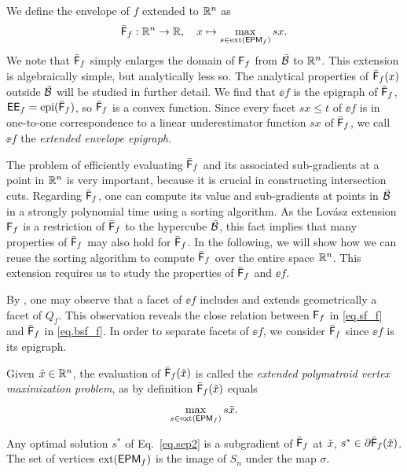 We define the envelope of $f$ extended to $\mathbb R^n$ as
\begin{equation}
    \label{eq.bsf_f}
    \bar{\mathsf F}_{f}: \mathbb R^n \to \mathbb R, \quad x\mapsto \max_{s \in \operatorname{ext}(\mathsf{EPM}_{f})}sx.
\end{equation}
We note that $\bar{\mathsf F}_{f}$ simply enlarges the domain of ${\mathsf F}_f$ from $\bar{\mathcal B}$ to $\mathbb R^n$. This extension is algebraically simple, but analytically less so. The analytical properties of $\bar{\mathsf F}_{f}(x)$ outside $\bar{\mathcal B}$ will be studied in further detail. We find that
$\ee{f}$ is the epigraph of $\bar{\mathsf F}_{f}$,  \ie $\mathsf{EE}_{f}  = \operatorname{epi}(\bar{\mathsf F}_{f})$, so $\bar{\mathsf F}_{f}$ is a convex function. Since every facet $sx \le t$ of $\ee{f}$  is in one-to-one correspondence to a linear underestimator function $sx$ of $\bar{\mathsf F}_{f}$, we call $\ee{f}$ the \textit{extended envelope epigraph}.


The problem of efficiently evaluating $\bar{\mathsf F}_{f}$ and its associated sub-gradients at a point in $\mathbb R^n$ is very important, because  it is crucial in constructing intersection cuts. Regarding $\bar{\mathsf F}_{f}$, one can compute its value and sub-gradients  at points in $\bar{\mathcal B}$ in a strongly polynomial time using a  sorting algorithm. As the Lovász extension ${\mathsf F}_f$  is a restriction of $\bar{\mathsf F}_{f}$ to the hypercube $\bar{\mathcal B}$, this fact implies that  many properties of $\bar{\mathsf F}_{f}$ may also hold for $\bar{\mathsf F}_{f}$.  In the following, we will show how we can reuse the sorting algorithm to compute $\bar{\mathsf F}_{f}$ over the entire space $\mathbb R^n$. This extension requires us to study the properties of $\bar{\mathsf F}_{f}$ and $\ee{f}$.  



By , one may observe that a facet of $\ee{f}$  includes and extends geometrically a facet of $Q_f$. This observation reveals the close relation between ${\mathsf F}_f$ in \eqref{eq.sf_f} and $\bar{\mathsf F}_f$ in \eqref{eq.bsf_f}.
In order to separate facets of $\ee{f}$, we consider $\bar{\mathsf F}_{f}$ since $\ee{f}$ is its epigraph.



 

Given $\tilde{x} \in \mathbb R^n$, the evaluation of $\bar{\mathsf F}_{f}(\tilde{x})$ is called the \textit{extended polymatroid vertex maximization problem}, as by definition $\bar{\mathsf F}_{f}(\tilde{x}) $ equals
\begin{equation}
\label{eq.sep2}
    \max_{s \in \operatorname{ext}(\mathsf{EPM}_{f})} s \tilde{x}.
\end{equation}

  Any optimal solution $s^\ast$ of Eq.~\eqref{eq.sep2} is a subgradient of $\bar{\mathsf F}_{f}$ at $\tilde{x}$, \ie $s^\ast \in \partial \bar{\mathsf F}_{f}(\tilde{x})$.
  The set of vertices  $\operatorname{ext}(\mathsf{EPM}_{f})$ is  the image of  $S_n$ under the map $\sigma$.

